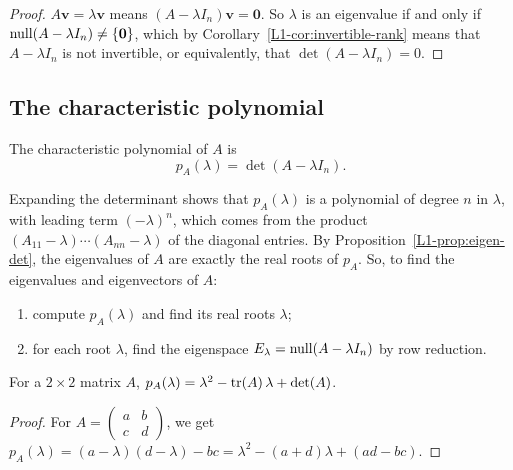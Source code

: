 \begin{proof}
    $A\mathbf{v} = \lambda \mathbf{v}$ means $(A - \lambda I_n)\mathbf{v} = \mathbf{0}$. So $\lambda$ is an eigenvalue if and only if $\operatorname{null}(A - \lambda I_n) \neq \{\mathbf{0}\}$, which by Corollary~\ref{L1-cor:invertible-rank} means that $A - \lambda I_n$ is not invertible, or equivalently, that $\det(A - \lambda I_n) = 0$.
\end{proof}

\subsection{The characteristic polynomial}

\begin{definition}
    The characteristic polynomial of $A$ is
    \[p_A(\lambda) = \det(A - \lambda I_n).\]
\end{definition}

Expanding the determinant shows that $p_A(\lambda)$ is a polynomial of degree $n$ in $\lambda$, with leading term $(-\lambda)^n$, which comes from the product $(A_{11} - \lambda) \cdots (A_{nn} - \lambda)$ of the diagonal entries. By Proposition~\ref{L1-prop:eigen-det}, the eigenvalues of $A$ are exactly the real roots of $p_A$. So, to find the eigenvalues and eigenvectors of $A$:
\begin{enumerate}
    \item compute $p_A(\lambda)$ and find its real roots $\lambda$;
    \item for each root $\lambda$, find the eigenspace $E_\lambda = \operatorname{null}(A - \lambda I_n)$ by row reduction.
\end{enumerate}

\begin{proposition}\label{L1-prop:char-poly-2x2}
    For a $2 \times 2$ matrix $A$, $p_A(\lambda) = \lambda^2 - \operatorname{tr}(A)\, \lambda + \det(A)$.
\end{proposition}

\begin{proof}
    For $A = \begin{pmatrix} a & b \\ c & d \end{pmatrix}$, we get $p_A(\lambda) = (a - \lambda)(d - \lambda) - bc = \lambda^2 - (a + d)\lambda + (ad - bc)$.
\end{proof}

